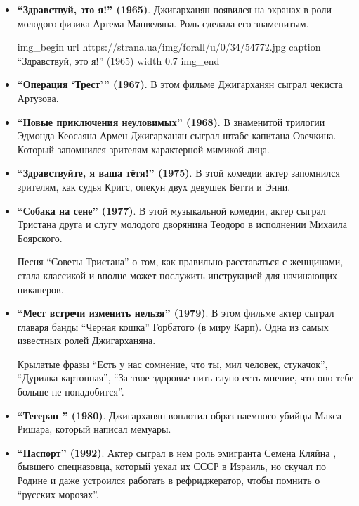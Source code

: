 \begin{itemize}
\item \textbf{\enquote{Здравствуй, это я!} (1965)}. Джигарханян появился на экранах в роли
молодого физика Артема Манвеляна. Роль сделала его знаменитым.

\ifcmt
img_begin 
	url https://strana.ua/img/forall/u/0/34/54772.jpg
	caption \enquote{Здравствуй, это я!} (1965)
	width 0.7
img_end
\fi

\item \textbf{\enquote{Операция \enquote{Трест}} (1967)}. В этом фильме Джигарханян сыграл чекиста
Артузова.

\item \textbf{\enquote{Новые приключения неуловимых} (1968)}. В знаменитой трилогии Эдмонда
Кеосаяна Армен Джигарханян сыграл штабс-капитана Овечкина. Который
запомнился зрителям характерной мимикой лица.

\item \textbf{\enquote{Здравствуйте, я ваша тётя!} (1975)}. В этой комедии актер запомнился
   зрителям, как судья Кригс, опекун двух девушек \dshM Бетти и Энни.

\item \textbf{\enquote{Собака на сене} (1977)}. В этой музыкальной комедии, актер сыграл Тристана \dshM друга и слугу молодого дворянина Теодоро в исполнении Михаила Боярского.

   Песня \enquote{Советы Тристана} о том, как правильно расставаться с женщинами,
   стала классикой и вполне может послужить инструкцией для начинающих
   пикаперов. 

\item \textbf{\enquote{Мест встречи изменить нельзя} (1979)}. В этом фильме актер сыграл главаря
   банды \enquote{Черная кошка} Горбатого (в миру \dshM Карп). Одна из самых известных
   ролей Джигарханяна. 

   Крылатые фразы \dshM \enquote{Есть у нас сомнение, что ты, мил человек, стукачок},
   \enquote{Дурилка картонная},  \enquote{За твое здоровье пить глупо \dshM есть мнение, что оно
тебе больше не понадобится}.

	 \item \textbf{\enquote{Тегеран } (1980)}. Джигарханян воплотил образ наемного убийцы Макса
   Ришара, который написал мемуары.

	 \item \textbf{\enquote{Паспорт} (1992)}. Актер сыграл в нем роль эмигранта Семена
					 Кляйна , бывшего спецназовца, который уехал их СССР в Израиль, но
								скучал по Родине и даже устроился работать в рефриджератор,
								чтобы помнить о \enquote{русских морозах}. 


\end{itemize}
